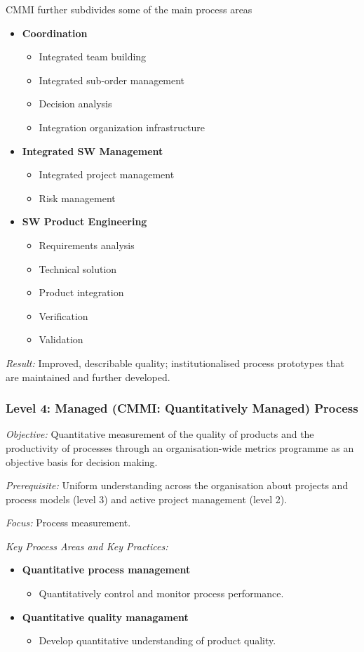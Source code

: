 \documentclass[11pt,a4paper]{article}
\begin{document}
CMMI further subdivides some of the main process areas
\begin {itemize} 
\item \textbf {Coordination}
  \begin {itemize} 
  \item Integrated team building
  \item Integrated sub-order management
  \item Decision analysis
  \item Integration organization infrastructure
  \end {itemize}
\item \textbf {Integrated SW Management}
  \begin {itemize} 
  \item Integrated project management
  \item Risk management
  \end {itemize}
\item \textbf {SW Product Engineering}
  \begin {itemize} 
  \item Requirements analysis
  \item Technical solution
  \item Product integration
  \item Verification
  \item Validation
  \end {itemize}
\end {itemize}

\emph{Result:} Improved, describable quality; institutionalised process
prototypes that are maintained and further developed.

\subsubsection*{Level 4: Managed (CMMI: Quantitatively Managed) Process}

\emph{Objective:} Quantitative measurement of the quality of products and the
productivity of processes through an organisation-wide metrics programme as an
objective basis for decision making.

\emph{Prerequisite:} Uniform understanding across the organisation about
projects and process models (level 3) and active project management (level 2).

\emph{Focus:} Process measurement.

\emph{Key Process Areas and Key Practices:}
\begin{itemize}
\item \textbf{Quantitative process management}
  \begin{itemize}
  \item Quantitatively control and monitor process performance.
  \end{itemize}
\item \textbf{Quantitative quality managament}
  \begin{itemize}
  \item  Develop quantitative understanding of product quality.
  \end{itemize}
\end{itemize}
\end{document}
